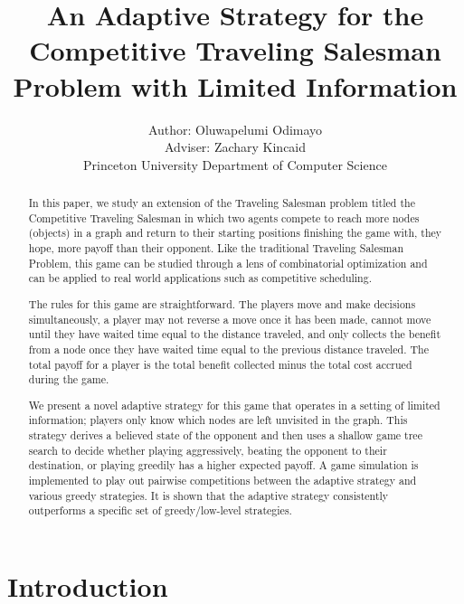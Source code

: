 \documentclass[pageno]{jpaper}
\begin{document}
\title{
An Adaptive Strategy for the Competitive Traveling Salesman Problem with Limited Information}

\author{Author: Oluwapelumi Odimayo \\ Adviser: Zachary Kincaid \\ Princeton University Department of Computer Science}

\date{}
\maketitle

\thispagestyle{empty}
\doublespacing

\begin{abstract}
	In this paper, we study an extension of the Traveling Salesman problem titled the Competitive Traveling Salesman in which two agents compete to reach more nodes (objects) in a graph and return to their starting positions finishing the game with, they hope, more payoff than their opponent. Like the traditional Traveling Salesman Problem, this game can be studied through a lens of combinatorial optimization and can be applied to real world applications such as competitive scheduling. \par 
	The rules for this game are straightforward. The players move and make decisions simultaneously, a player may not reverse a move once it has been made, cannot move until they have waited time equal to the distance traveled, and only collects the benefit from a node once they have waited time equal to the previous distance traveled. The total payoff for a player is the total benefit collected minus the total cost accrued during the game. 
	\par We present a novel adaptive strategy for this game that operates in a setting of limited information; players only know which nodes are left unvisited in the graph. This strategy derives a 
	believed state of the opponent and then uses a shallow game tree search to decide whether playing aggressively, beating the opponent to their destination, or playing greedily has a higher expected payoff. A game simulation is implemented to play out pairwise competitions between the adaptive strategy and various greedy strategies. It is shown that the adaptive strategy consistently outperforms a specific set of greedy/low-level strategies.\newline
\end{abstract}
\newpage

\section{Introduction}
\end{document}
